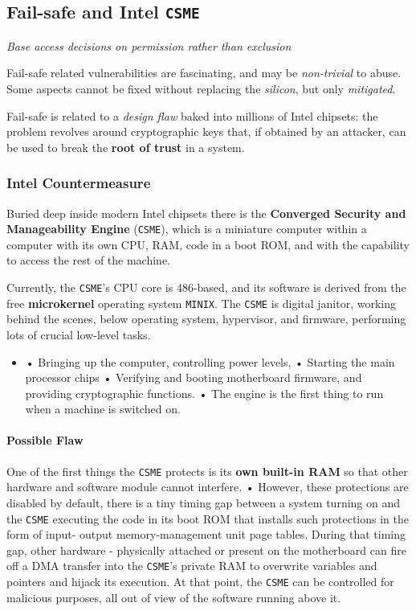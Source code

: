 \subsection{Fail-safe and Intel \texttt{CSME}}
\begin{center}
   \textit{Base access decisions on permission rather than
   exclusion}
\end{center}
Fail-safe related vulnerabilities are fascinating, and may be \textit{non-trivial} to abuse.
Some aspects cannot be fixed without replacing the \textit{silicon}, but only \textit{mitigated}.

Fail-safe is related to a \textit{design flaw} baked into millions of Intel chipsets:
the problem revolves around cryptographic keys that, if obtained by an attacker,
can be used to break the \textbf{root of trust} in a system.

\subsubsection{Intel Countermeasure}
Buried deep inside modern Intel chipsets there is the \textbf{Converged
Security and Manageability Engine} (\texttt{CSME}),
which is a miniature computer within a computer with its own CPU, RAM, code in a boot ROM, and with the capability to access the rest of the machine.

Currently, the \texttt{CSME}'s CPU core is 486-based, and its software is
derived from the free \textbf{microkernel} operating system \texttt{MINIX}.
The \texttt{CSME} is digital janitor, working behind the scenes, below
operating system, hypervisor, and firmware, performing lots of
crucial low-level tasks.
\begin{itemize}
   \item 
   • Bringing up the computer, controlling power levels,
   • Starting the main processor chips
   • Verifying and booting motherboard firmware, and providing
   cryptographic functions.
   • The engine is the first thing to run when a machine is switched on.
\end{itemize}

\paragraph{Possible Flaw}
One of the first things the \texttt{CSME} protects is its \textbf{own built-in RAM} so that other hardware and software module cannot interfere.
• However, these protections are disabled by default, there is a tiny timing gap between a system turning on and the \texttt{CSME} executing the code
in its boot ROM that installs such protections in the form of input-
output memory-management unit page tables.
During that timing gap, other hardware - physically attached or
present on the motherboard can fire off a DMA transfer into the
\texttt{CSME}’s private RAM to overwrite variables and pointers and hijack
its execution. 
At that point, the \texttt{CSME} can be controlled for
malicious purposes, all out of view of the software running above it.


